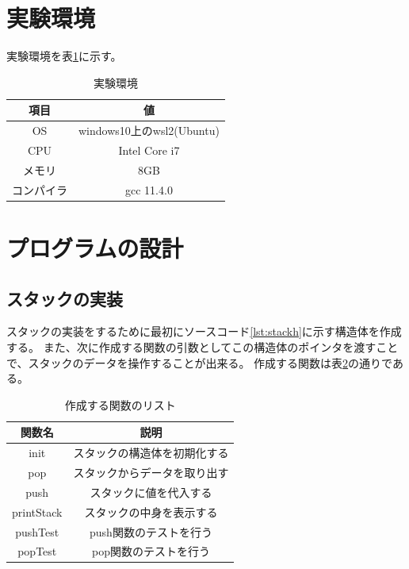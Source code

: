 \documentclass[dvipdfmx]{jsarticle}
\begin{document}
\section{実験環境}
実験環境を表\ref{tab:environment}に示す。
\begin{table}[ht]
  \centering
  \begin{tabular}{|c|c|}
    \hline
    \textbf{項目} & \textbf{値}              \\
    \hline
    OS          & windows10上のwsl2(Ubuntu) \\
    \hline
    CPU         & Intel Core i7           \\
    \hline
    メモリ         & 8GB                     \\
    \hline
    コンパイラ       & gcc 11.4.0              \\
    \hline
  \end{tabular}
  \caption{実験環境}
  \label{tab:environment}
\end{table}
\newpage
\section{プログラムの設計}
\subsection{スタックの実装}
スタックの実装をするために最初にソースコード\ref{lst:stackh}に示す構造体を作成する。
また、次に作成する関数の引数としてこの構造体のポインタを渡すことで、スタックのデータを操作することが出来る。
作成する関数は表\ref{tab:functions}の通りである。
\begin{table}[ht]
  \centering
  \begin{tabular}{|c|c|}
    \hline
    \textbf{関数名} & \textbf{説明}    \\
    \hline
    init         & スタックの構造体を初期化する \\
    \hline
    pop          & スタックからデータを取り出す \\
    \hline
    push         & スタックに値を代入する    \\
    \hline
    printStack   & スタックの中身を表示する   \\
    \hline
    pushTest     & push関数のテストを行う  \\
    \hline
    popTest      & pop関数のテストを行う   \\
    \hline
  \end{tabular}
  \caption{作成する関数のリスト}
  \label{tab:functions}
\end{table}
\end{document}
